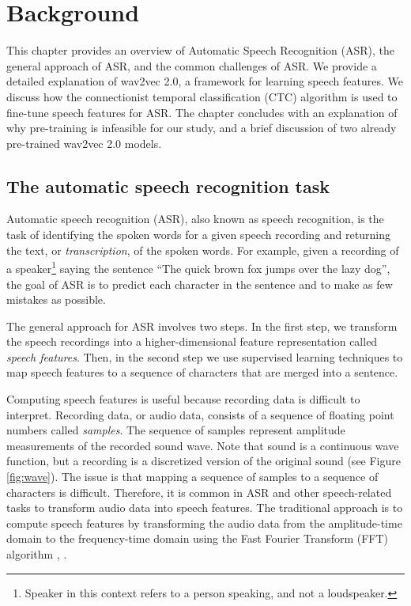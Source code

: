 \graphicspath{{background/fig/}}

\chapter{Background} \label{chap:background}
This chapter provides an overview of Automatic Speech Recognition (ASR), the general approach of ASR, and the common challenges of ASR.
We provide a detailed explanation of wav2vec 2.0, a framework for learning speech features.
We discuss how the connectionist temporal classification (CTC) algorithm is used to fine-tune speech features for ASR.
The chapter concludes with an explanation of why pre-training is infeasible for our study,
and a brief discussion of two already pre-trained wav2vec 2.0 models.

\section{The automatic speech recognition task}\label{sec:background}
Automatic speech recognition (ASR), also known as speech recognition, 
is the task of identifying the spoken words for a given speech recording and returning the text, or \emph{transcription}, of the spoken words.
For example, given a recording of a speaker\footnote{Speaker in this context refers to a person speaking, and not a loudspeaker.} saying the sentence ``The quick brown fox jumps over the lazy dog'',
the goal of ASR is to predict each character in the sentence and to make as few mistakes as possible.

The general approach for ASR involves two steps.
In the first step, we transform the speech recordings into a higher-dimensional feature representation called \emph{speech features}.
Then, in the second step we use supervised learning techniques to map speech features
to a sequence of characters that are merged into a sentence.

Computing speech features is useful because recording data is difficult to interpret. 
Recording data, or audio data, consists of a sequence of floating point numbers called \emph{samples}.
The sequence of samples represent amplitude measurements of the recorded sound wave. 
Note that sound is a continuous wave function, but a recording is a discretized version of the original sound (see Figure \ref{fig:wave}).
The issue is that mapping a sequence of samples to a sequence of characters is difficult.
Therefore, it is common in ASR and other speech-related tasks to transform audio data into speech features.
The traditional approach is to compute speech features by transforming the audio data from the amplitude-time domain 
to the frequency-time domain using the Fast Fourier Transform (FFT) algorithm \cite{cochran1967fast}, \cite{cooley1969fast}.


